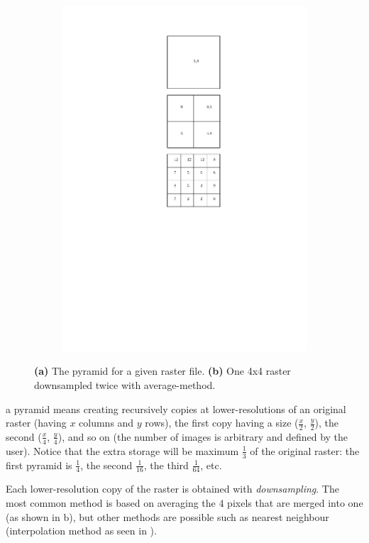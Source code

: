 \begin{figure}
\begin{subfigure}[b]{0.15\linewidth}
    \includegraphics[width=\textwidth]{figs/pyramids2.pdf}
    \caption{}
  \end{subfigure}
\caption{\textbf{(a)} The pyramid for a given raster file. \textbf{(b)} One 4x4 raster downsampled twice with average-method.}%
\end{figure}
a pyramid means creating recursively copies at lower-resolutions of an original raster (having $x$ columns and $y$ rows), the first copy having a size ($\frac{x}{2}$, $\frac{y}{2}$), the second ($\frac{x}{4}$, $\frac{y}{4}$), and so on (the number of images is arbitrary and defined by the user).
Notice that the extra storage will be maximum $\frac{1}{3}$ of the original raster: the first pyramid is $\frac{1}{4}$, the second $\frac{1}{16}$, the third $\frac{1}{64}$, etc.

Each lower-resolution copy of the raster is obtained with \emph{downsampling}.
The most common method is based on averaging the 4 pixels that are merged into one (as shown in b), but other methods are possible such as nearest neighbour (interpolation method as seen in ).


